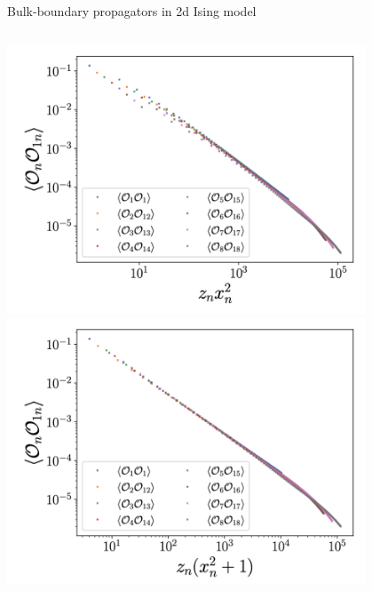 \documentclass{fdubeamer}
\begin{document}
\begin{frame}{Bulk-boundary propagators in 2d Ising model}
\begin{columns}[T]
    \centering
    \includegraphics[width=0.8\textwidth]{images/holographic/bulk-boundary-propagator-1.png}
    \includegraphics[width=0.8\textwidth]{images/holographic/bulk-boundary-propagator-2.png}
    \vspace{-0.5em}

\end{columns}


\end{frame}
\end{document}
